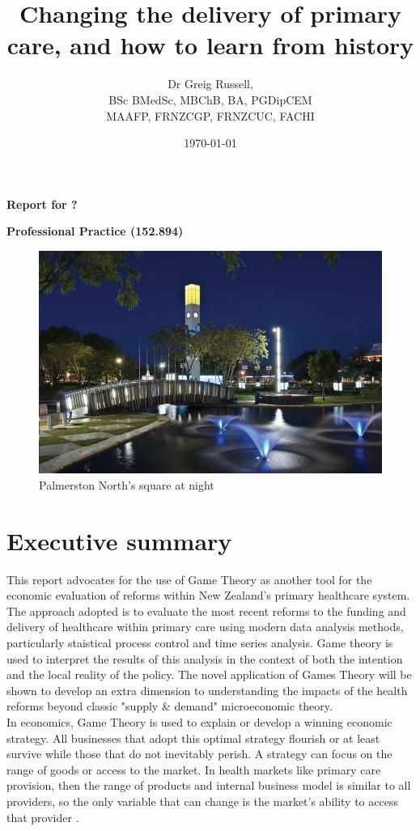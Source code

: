 \documentclass[11pt,a4paper]{article}
\title{\textbf{Changing the delivery of primary care, and how to learn from history}}
\author{Dr Greig Russell, \\ BSc BMedSc, MBChB, BA, PGDipCEM \\ MAAFP, FRNZCGP, FRNZCUC, FACHI}
\date{\today}
\begin{document}
\maketitle
\Large{\textbf{Report for ?}}

\Large{\textbf{Professional Practice (152.894)}}
\newline
\newline
\newline
\begin{figure}[htp]
\centering
\includegraphics[scale=0.6]{PN.png}
\caption{Palmerston North's square at night}
\label{}
\end{figure}

\pagebreak
\section{Executive summary}
This report advocates for the use of Game Theory as another tool for the economic evaluation of reforms within New Zealand's primary healthcare system. The approach adopted is to evaluate the most recent reforms to the funding and delivery of healthcare within primary care using modern data analysis methods, particularly staistical process control and time series analysis. Game theory is used to interpret the results of this analysis in the context of both the intention and the local reality of the policy. The novel application of Games Theory will be shown to develop an extra dimension to understanding the impacts of the health reforms beyond classic "supply \& demand" microeconomic theory.\\

In economics, Game Theory is used to explain or develop a winning economic strategy. All businesses that adopt this optimal strategy flourish or at least survive while those that do not inevitably perish. A strategy can focus on the range of goods or access to the market. In health markets like primary care provision, then the range of products and internal business model is similar to all providers, so the  only variable that can change is the market's ability to access that provider \citep{dinar2008game}. \\
\end{document}
